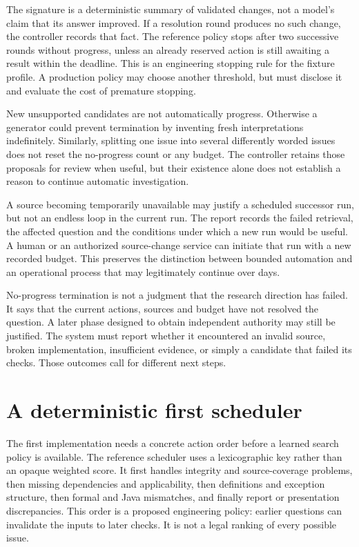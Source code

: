 \documentclass[12pt,a4paper,oneside,openany]{book}
\begin{document}
The signature is a deterministic summary of validated changes, not a model's
claim that its answer improved. If a resolution round produces no such change,
the controller records that fact. The reference policy stops after two successive
rounds without progress, unless an already reserved action is still awaiting a
result within the deadline. This is an engineering stopping rule for the fixture
profile. A production policy may choose another threshold, but must disclose it
and evaluate the cost of premature stopping.

New unsupported candidates are not automatically progress. Otherwise a generator
could prevent termination by inventing fresh interpretations indefinitely.
Similarly, splitting one issue into several differently worded issues does not
reset the no-progress count or any budget. The controller retains those proposals
for review when useful, but their existence alone does not establish a reason to
continue automatic investigation.

A source becoming temporarily unavailable may justify a scheduled successor run,
but not an endless loop in the current run. The report records the failed
retrieval, the affected question and the conditions under which a new run would
be useful. A human or an authorized source-change service can initiate that run
with a new recorded budget. This preserves the distinction between bounded
automation and an operational process that may legitimately continue over days.

No-progress termination is not a judgment that the research direction has failed.
It says that the current actions, sources and budget have not resolved the
question. A later phase designed to obtain independent authority may still be
justified. The system must report whether it encountered an invalid source,
broken implementation, insufficient evidence, or simply a candidate that failed
its checks. Those outcomes call for different next steps.

\section{A deterministic first scheduler}
\label{merge:M06:14}


The first implementation needs a concrete action order before a learned search
policy is available. The reference scheduler uses a lexicographic key rather
than an opaque weighted score. It first handles integrity and source-coverage
problems, then missing dependencies and applicability, then definitions and
exception structure, then formal and Java mismatches, and finally report or
presentation discrepancies. This order is a proposed engineering policy: earlier
questions can invalidate the inputs to later checks. It is not a legal ranking
of every possible issue.
\end{document}
